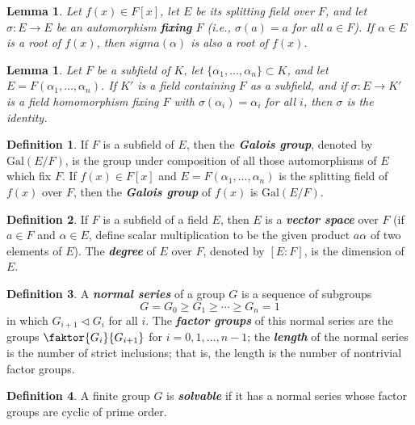 \documentclass[12pt]{report}
\newtheorem{lemma}[theorem]{Lemma}
\theoremstyle{definition}
\newtheorem*{definition}{Definition}
\newcommand{\term}[1]{\textbf{\textit{#1}}}
\begin{document}
\begin{lemma}
	Let $f(x)\in F[x]$, let $E$ be its splitting field over $F$, and let $\sigma:E\to E$ be an automorphism \term{fixing} $F$ (i.e., $\sigma(a)=a$ for all $a\in F$).
	If $\alpha\in E$ is a root of $f(x)$, then $sigma(\alpha)$ is also a root of $f(x)$.
\end{lemma}

\begin{lemma}
	Let $F$ be a subfield of $K$, let $\{\alpha_1,\ldots,\alpha_n\}\subset K$, and let $E=F(\alpha_1,\ldots,\alpha_n)$. If $K'$ is a field containing $F$ as a subfield, and if $\sigma:E\to K'$ is a field homomorphism fixing $F$ with $\sigma(\alpha_i)=\alpha_i$ for all $i$, then $\sigma$ is the identity.
\end{lemma}

\begin{definition}
	If $F$ is a subfield of $E$, then the \term{Galois group}, denoted by $\mathrm{Gal}(E/F)$, is the group under composition of all those automorphisms of $E$ which fix $F$.
	If $f(x)\in F[x]$ and $E=F(\alpha_1,\ldots,\alpha_n)$ is the splitting field of $f(x)$ over $F$, then the \term{Galois group} of $f(x)$ is $\mathrm{Gal}(E/F)$.
\end{definition}

\begin{definition}
	If $F$ is a subfield of a field $E$, then $E$ is a \term{vector space} over $F$ (if $a\in F$ and $\alpha\in E$, define scalar multiplication to be the given product $a\alpha$ of two elements of $E$).
	The \term{degree} of $E$ over $F$, denoted by $[E:F]$, is the dimension of $E$.
\end{definition}

\begin{definition}
	A \term{normal series} of a group $G$ is a sequence of subgroups
	\[ G = G_0 \geq G_1 \geq \cdots \geq G_n = 1 \]
	in which $G_{i+1}\vartriangleleft G_i$ for all $i$.
	The \term{factor groups} of this normal series are the groups $\faktor{G_i}{G_{i+1}}$ for $i=0, 1, \ldots, n-1$; the \term{length} of the normal series is the number of strict inclusions; that is, the length is the number of nontrivial factor groups.
\end{definition}

\begin{definition}
	A finite group $G$ is \term{solvable} if it has a normal series whose factor groups are cyclic of prime order.
\end{definition}
\end{document}
